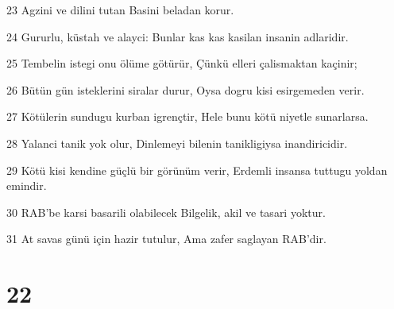 \par 23 Agzini ve dilini tutan Basini beladan korur.
\par 24 Gururlu, küstah ve alayci: Bunlar kas kas kasilan insanin adlaridir.
\par 25 Tembelin istegi onu ölüme götürür, Çünkü elleri çalismaktan kaçinir;
\par 26 Bütün gün isteklerini siralar durur, Oysa dogru kisi esirgemeden verir.
\par 27 Kötülerin sundugu kurban igrençtir, Hele bunu kötü niyetle sunarlarsa.
\par 28 Yalanci tanik yok olur, Dinlemeyi bilenin tanikligiysa inandiricidir.
\par 29 Kötü kisi kendine güçlü bir görünüm verir, Erdemli insansa tuttugu yoldan emindir.
\par 30 RAB'be karsi basarili olabilecek Bilgelik, akil ve tasari yoktur.
\par 31 At savas günü için hazir tutulur, Ama zafer saglayan RAB'dir.

\chapter{22}

